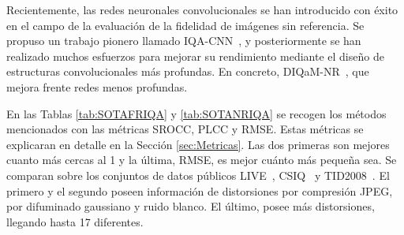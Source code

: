 Recientemente, las redes neuronales convolucionales se han introducido con 
éxito en el campo de la evaluación de la fidelidad de imágenes sin referencia. 
Se propuso un trabajo pionero llamado IQA-CNN~\cite{IQA-CNN}, 
y posteriormente se han realizado muchos esfuerzos para mejorar su rendimiento 
mediante el diseño de estructuras convolucionales más profundas. En concreto,
DIQaM-NR~\cite{DIQaM}, que mejora frente redes menos profundas.

En las Tablas \ref{tab:SOTAFRIQA} y \ref{tab:SOTANRIQA} se recogen los 
métodos mencionados con las métricas SROCC, PLCC y RMSE. Estas métricas 
se explicaran en detalle en la Sección \ref{sec:Metricas}. 
Las dos primeras son mejores cuanto más cercas al 1 y 
la última, RMSE, es mejor cuánto más pequeña sea.  
Se comparan sobre los conjuntos de datos públicos
LIVE~\cite{LIVE, LIVE1, SSIM}, CSIQ~\cite{CSIQ} y TID2008~\cite{TID2008}.
El primero y el segundo poseen información de distorsiones por compresión JPEG, 
por difuminado gaussiano y ruido blanco. 
El último, posee más distorsiones, llegando hasta 17 diferentes.

